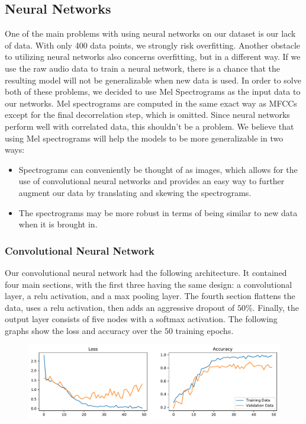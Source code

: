 \documentclass[11pt]{article}
\begin{document}
\subsection{Neural Networks}
One of the main problems with using neural networks on our dataset is our lack of data.
With only 400 data points, we strongly risk overfitting.
Another obstacle to utilizing neural networks also concerns overfitting, but in a different way.
If we use the raw audio data to train a neural network, there is a chance that the resulting model will not be generalizable when new data is used.
In order to solve both of these problems, we decided to use Mel Spectrograms as the input data to our networks.
Mel spectrograms are computed in the same exact way as MFCCs except for the final decorrelation step, which is omitted.
Since neural networks perform well with correlated data, this shouldn't be a problem.
We believe that using Mel spectrograms will help the models to be more generalizable in two ways:
\begin{itemize}
   \item Spectrograms can conveniently be thought of as images, which allows for the use of convolutional neural networks and provides an easy way to further augment our data by translating and skewing the spectrograms.
   \item The spectrograms may be more robust in terms of being similar to new data when it is brought in.
\end{itemize}

\subsubsection{Convolutional Neural Network}
Our convolutional neural network had the following architecture.
It contained four main sections, with the first three having the same design: a convolutional layer, a relu activation, and a max pooling layer.
The fourth section flattens the data, uses a relu activation, then adds an aggressive dropout of $50 \%$.
Finally, the output layer consists of five nodes with a softmax activation.
The following graphs show the loss and accuracy over the $ 50 $ training epochs.
\begin{figure}[!htb]
\begin{center}
   \includegraphics[width=0.8\linewidth]{../cnn_models/first_try_loss_acc.pdf}
\end{center}
\end{figure}
\end{document}

